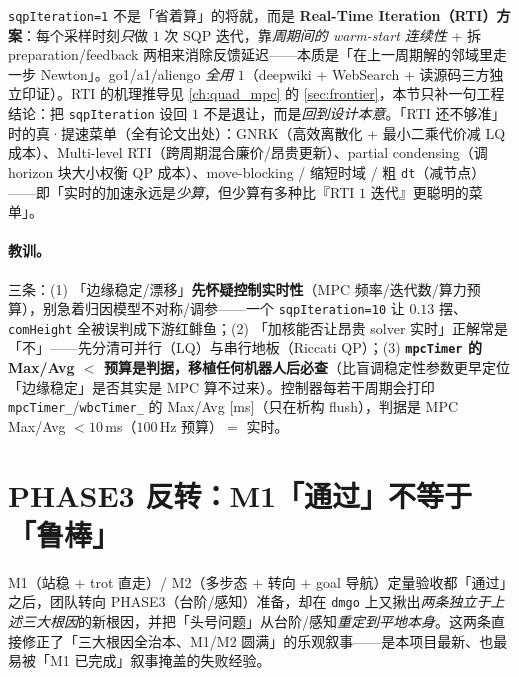 \begin{insight}[\texttt{sqpIteration=1} = RTI = 正确实时设计，不是妥协]\label{ins:qadv-rti}
\texttt{sqpIteration=1} 不是「省着算」的将就，而是 \textbf{Real-Time Iteration（RTI）方案}\cite{diehl2002rti}：每个采样时刻\emph{只}做 $1$ 次 SQP 迭代，靠\emph{周期间的 warm-start 连续性} + 拆 preparation/feedback 两相来消除反馈延迟——本质是「在上一周期解的邻域里走一步 Newton」。go1/a1/aliengo \emph{全用} $1$（deepwiki + WebSearch + 读源码三方独立印证）。RTI 的机理推导见 \cref{ch:quad_mpc} 的 \cref{sec:frontier}，本节只补一句工程结论：把 \texttt{sqpIteration} 设回 $1$ 不是退让，而是\emph{回到设计本意}。「RTI 还不够准」时的真·提速菜单（全有论文出处）：GNRK（高效离散化 + 最小二乘代价减 LQ 成本）、Multi-level RTI（跨周期混合廉价/昂贵更新）、partial condensing（调 horizon 块大小权衡 QP 成本）、move-blocking / 缩短时域 / 粗 \texttt{dt}（减节点）——即「实时的加速永远是\emph{少算}，但少算有多种比『RTI $1$ 迭代』更聪明的菜单」。
\end{insight}

\paragraph{教训。}
三条：(1) 「边缘稳定/漂移」\textbf{先怀疑控制实时性}（MPC 频率/迭代数/算力预算），别急着归因模型不对称/调参——一个 \texttt{sqpIteration=10} 让 $0.13$ 摆、\texttt{comHeight} 全被误判成下游红鲱鱼；(2) 「加核能否让昂贵 solver 实时」正解常是「不」——先分清可并行（LQ）与串行地板（Riccati QP）；(3) \textbf{\texttt{mpcTimer} 的 Max/Avg $<$ 预算是判据，移植任何机器人后必查}（比盲调稳定性参数更早定位「边缘稳定」是否其实是 MPC 算不过来）。控制器每若干周期会打印 \texttt{mpcTimer\_}/\allowbreak\texttt{wbcTimer\_} 的 Max/Avg [ms]（只在析构 flush），判据是 MPC Max/Avg $<10$\,ms（$100$\,Hz 预算）$=$ 实时。

\section{PHASE3 反转：M1「通过」不等于「鲁棒」}
\label{sec:qadv-phase3}

M1（站稳 + trot 直走）/ M2（多步态 + 转向 + goal 导航）定量验收都「通过」之后，团队转向 PHASE3（台阶/感知）准备，却在 \texttt{dmgo} 上又揪出\emph{两条独立于上述三大根因}的新根因，并把「头号问题」从台阶/感知\emph{重定到平地本身}。这两条直接修正了「三大根因全治本、M1/M2 圆满」的乐观叙事——是本项目最新、也最易被「M1 已完成」叙事掩盖的失败经验。

